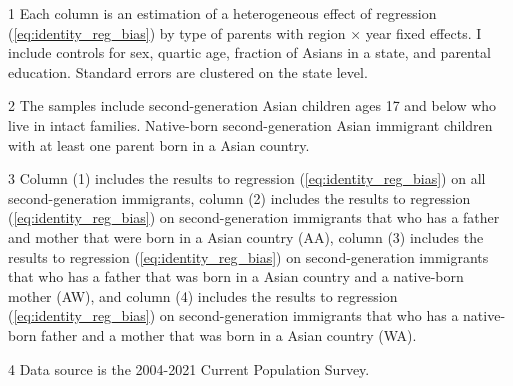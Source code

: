 \begin{table}[H]
{\begin{threeparttable}
\begin{tablenotes}
\small
\item[1] \footnotesize{Each column is an estimation of a heterogeneous effect of regression (\ref{eq:identity_reg_bias}) by 
                      type of parents with region × year fixed effects. 
                      I include controls for sex, quartic age, fraction of Asians in a state, and parental education.
                      Standard errors are clustered on the state level.}
\item[2] \footnotesize{The samples include second-generation Asian children ages 17 and below who live in intact families. 
                      Native-born second-generation Asian 
                      immigrant children with at least one parent born in a Asian 
                      country.}
\item[3] \footnotesize{Column (1) includes the results to regression (\ref{eq:identity_reg_bias}) on all second-generation immigrants, 
                                        column (2) includes the results to regression (\ref{eq:identity_reg_bias}) on second-generation immigrants that who has a father and mother that were born in a Asian country (AA),
                                        column (3) includes the results to regression (\ref{eq:identity_reg_bias}) on second-generation immigrants that who has a father that was born in a Asian country and a native-born mother (AW), and
                                        column (4) includes the results to regression (\ref{eq:identity_reg_bias}) on second-generation immigrants that who has a native-born father and a mother that was born in a Asian country (WA).}
\item[4] \footnotesize{Data source is the 2004-2021 Current Population Survey.}
\end{tablenotes}
\end{threeparttable}}
\end{table}

